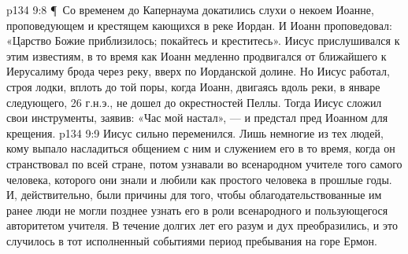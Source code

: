 \vs p134 9:8 \P\ Со временем до Капернаума докатились слухи о некоем Иоанне, проповедующем и крестящем кающихся в реке Иордан. И Иоанн проповедовал: «Царство Божие приблизилось; покайтесь и креститесь». Иисус прислушивался к этим известиям, в то время как Иоанн медленно продвигался от ближайшего к Иерусалиму брода через реку, вверх по Иорданской долине. Но Иисус работал, строя лодки, вплоть до той поры, когда Иоанн, двигаясь вдоль реки, в январе следующего, 26 г.н.э., не дошел до окрестностей Пеллы. Тогда Иисус сложил свои инструменты, заявив: «Час мой настал», --- и предстал пред Иоанном для крещения.
\vs p134 9:9 Иисус сильно переменился. Лишь немногие из тех людей, кому выпало насладиться общением с ним и служением его в то время, когда он странствовал по всей стране, потом узнавали во всенародном учителе того самого человека, которого они знали и любили как простого человека в прошлые годы. И, действительно, были причины для того, чтобы облагодательствованные им ранее люди не могли позднее узнать его в роли всенародного и пользующегося авторитетом учителя. В течение долгих лет его разум и дух преобразились, и это случилось в тот исполненный событиями период пребывания на горе Ермон.
